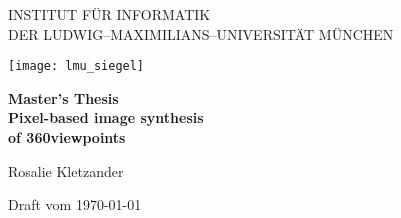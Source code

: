 \let\textacute\'

\thispagestyle{empty}

\begin{center}

\vspace*{-2cm}

{\Huge INSTITUT FÜR INFORMATIK\\[1mm]}
DER LUDWIG--MAXIMILIANS--UNIVERSITÄT MÜNCHEN\\

\vspace*{1cm}

\texttt{[image: lmu\_siegel]}

\vspace*{2cm}

{\Large \textbf{Master's Thesis}}\\ %

\vspace{2.0cm}
{\Huge \textbf{Pixel-based image synthesis}}\\
\vspace*{3mm}
{\Huge \textbf{of 360\degree viewpoints}}\\
\vspace{1.5cm}

{\LARGE Rosalie Kletzander} %

\vspace{3cm}
Draft vom \today %

\end{center}

\newpage


\thispagestyle{empty}
\cleardoublepage


\thispagestyle{empty}


